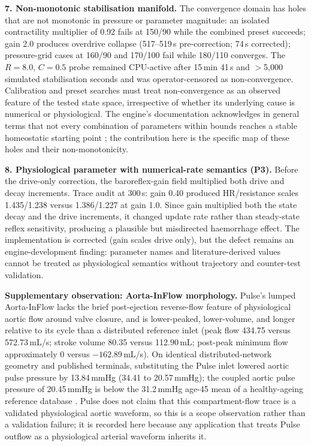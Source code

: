 \documentclass[preprint,12pt,nopreprintline]{elsarticle}
\begin{document}
\textbf{7. Non-monotonic stabilisation manifold.} The convergence domain has holes that are not monotonic in pressure or parameter magnitude: an isolated contractility multiplier of 0.92 fails at 150/90 while the combined preset succeeds; gain 2.0 produces overdrive collapse (517--519\,s pre-correction; 74\,s corrected); pressure-grid cases at 160/90 and 170/100 fail while 180/110 converges. The $R=8.0$, $C=0.5$ probe remained CPU-active after 15\,min 41\,s and $>$5{,}000 simulated stabilisation seconds and was operator-censored as non-convergence. Calibration and preset searches must treat non-convergence as an observed feature of the tested state space, irrespective of whether its underlying cause is numerical or physiological. The engine's documentation acknowledges in general terms that not every combination of parameters within bounds reaches a stable homeostatic starting point \cite{pulsepatient}; the contribution here is the specific map of these holes and their non-monotonicity.

\textbf{8. Physiological parameter with numerical-rate semantics (P3).} Before the drive-only correction, the baroreflex-gain field multiplied both drive and decay increments. Trace audit at 300\,s: gain 0.40 produced HR/resistance scales 1.435/1.238 versus 1.386/1.227 at gain 1.0. Since gain multiplied both the state decay and the drive increments, it changed update rate rather than steady-state reflex sensitivity, producing a plausible but misdirected haemorrhage effect. The implementation is corrected (gain scales drive only), but the defect remains an engine-development finding: parameter names and literature-derived values cannot be treated as physiological semantics without trajectory and counter-test validation.

\textbf{Supplementary observation: Aorta-InFlow morphology.} Pulse's lumped Aorta-InFlow lacks the brief post-ejection reverse-flow feature of physiological aortic flow around valve closure, and is lower-peaked, lower-volume, and longer relative to its cycle than a distributed reference inlet (peak flow 434.75 versus 572.73\,mL/s; stroke volume 80.35 versus 112.90\,mL; post-peak minimum flow approximately 0 versus $-162.89$\,mL/s). On identical distributed-network geometry and published terminals, substituting the Pulse inlet lowered aortic pulse pressure by 13.84\,mmHg (34.41 to 20.57\,mmHg); the coupled aortic pulse pressure of 20.45\,mmHg is below the 31.2\,mmHg age-45 mean of a healthy-ageing reference database \cite{charlton2019}. Pulse does not claim that this compartment-flow trace is a validated physiological aortic waveform, so this is a scope observation rather than a validation failure; it is recorded here because any application that treats Pulse outflow as a physiological arterial waveform inherits it.
\end{document}
